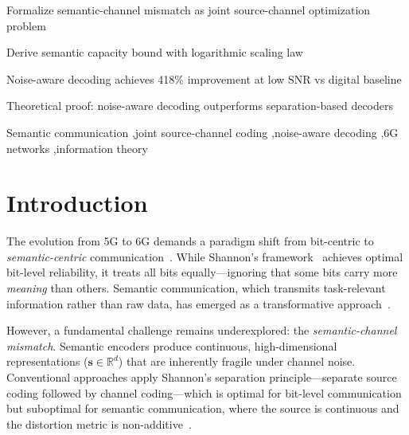 \documentclass[a4paper,fleqn]{cas-sc}
\begin{document}
\begin{highlights}
\item Formalize semantic-channel mismatch as joint source-channel optimization problem
\item Derive semantic capacity bound with logarithmic scaling law
\item Noise-aware decoding achieves 418\% improvement at low SNR vs digital baseline
\item Theoretical proof: noise-aware decoding outperforms separation-based decoders
\end{highlights}

\begin{keywords}
Semantic communication \sep joint source-channel coding \sep noise-aware decoding \sep 6G networks \sep information theory
\end{keywords}

\maketitle


\section{Introduction}\label{sec:intro}

The evolution from 5G to 6G demands a paradigm shift from bit-centric to \emph{semantic-centric} communication~\citep{letaief2022edge,letaief2019roadmap}. While Shannon's framework~\citep{shannon1948mathematical} achieves optimal bit-level reliability, it treats all bits equally---ignoring that some bits carry more \emph{meaning} than others. Semantic communication, which transmits task-relevant information rather than raw data, has emerged as a transformative approach~\citep{xie2021deep}.

However, a fundamental challenge remains underexplored: the \emph{semantic-channel mismatch}. Semantic encoders produce continuous, high-dimensional representations ($\mathbf{s} \in \mathbb{R}^d$) that are inherently fragile under channel noise. Conventional approaches apply Shannon's separation principle---separate source coding followed by channel coding---which is optimal for bit-level communication but suboptimal for semantic communication, where the source is continuous and the distortion metric is non-additive~\citep{kurka2020deepjssc}.
\end{document}
